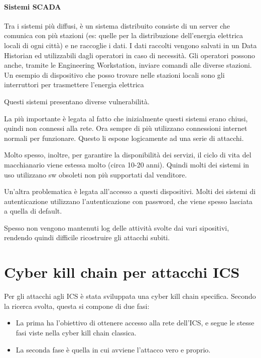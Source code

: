 \paragraph{Sistemi SCADA} Tra i sistemi più diffusi, è un sistema distribuito consiste di un server che comunica con più stazioni (es: quelle per la distribuzione dell'energia elettrica locali di ogni città) e ne raccoglie i dati. I dati raccolti vengono salvati in un Data Historian ed utilizzabili dagli operatori in caso di necessità. Gli operatori possono anche, tramite le Engineering Workstation, inviare comandi alle diverse stazioni. Un esempio di dispositivo che posso trovare nelle stazioni locali sono gli interruttori per trasmettere l'energia elettrica 

Questi sistemi presentano diverse vulnerabilità. 

La più importante è legata al fatto che  inizialmente questi sistemi erano chiusi, quindi non connessi alla rete. Ora sempre di più utilizzano connessioni internet normali per funzionare. Questo li espone logicamente ad una serie di attacchi.

Molto spesso, inoltre, per garantire la disponibilità dei servizi, il ciclo di vita del macchianario viene estessa molto (circa 10-20 anni). Quindi molti dei sistemi in uso utilizzano sw obsoleti non più supportati dal venditore.

Un'altra problematica è legata all'accesso a questi dispositivi. Molti dei sistemi di autenticazione utilizzano l'autenticazione con password, che viene spesso lasciata a quella di default.

Spesso non vengono mantenuti log delle attività svolte dai vari sipositivi, rendendo quindi difficile ricostruire gli attacchi subiti.

\section{Cyber kill chain per attacchi ICS}

Per gli attacchi agli ICS è stata sviluppata una cyber kill chain specifica. Secondo la ricerca svolta, questa si compone di due fasi:
\begin{itemize}
    \item La prima ha l'obiettivo di ottenere accesso alla rete dell'ICS, e segue le stesse fasi viste nella cyber kill chain classica.
    \item La seconda fase è quella in cui avviene l'attacco vero e proprio.
\end{itemize}


